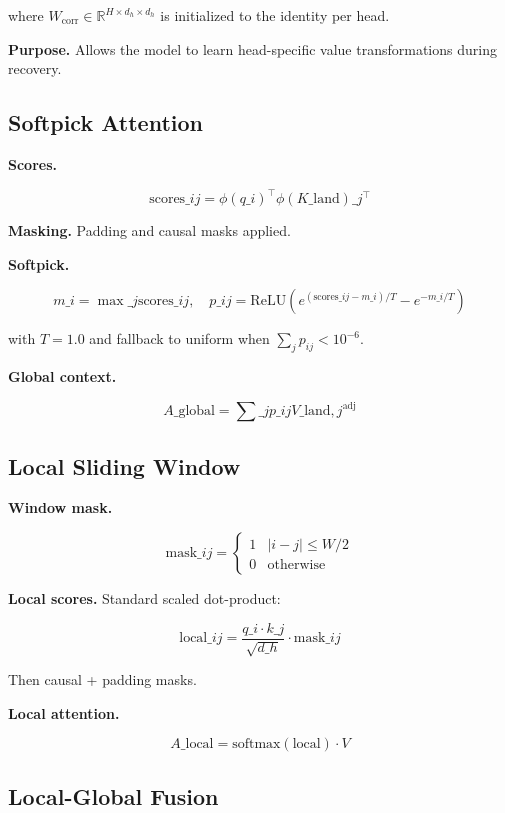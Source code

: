 where $W_\text{corr} \in \mathbb{R}^{H \times d_h \times d_h}$ is 
initialized to the identity per head.

\textbf{Purpose.} Allows the model to learn head-specific value transformations 
during recovery.

\subsection{Softpick Attention}

\textbf{Scores.}

\[
\text{scores}\_{ij} = \phi(q\_i)^\top \phi(K\_\text{land})\_j^\top
\tag{4.7}
\]

\textbf{Masking.} Padding and causal masks applied.

\textbf{Softpick.}

\[
m\_i = \max\_j \text{scores}\_{ij}, \quad
p\_{ij} = \text{ReLU}\!\left(e^{(\text{scores}\_{ij} - m\_i)/T} - e^{-m\_i/T}\right)
\tag{4.8}
\]

with $T = 1.0$ and fallback to uniform when $\sum_j p_{ij} < 10^{-6}$.

\textbf{Global context.}

\[
A\_\text{global} = \sum\_j p\_{ij} V\_{\text{land}, j}^\text{adj}
\tag{4.9}
\]

\subsection{Local Sliding Window}

\textbf{Window mask.}

\[
\text{mask}\_{ij} = \begin{cases} 1 & |i - j| \leq W/2 \\ 0 & \text{otherwise} \end{cases}
\tag{4.10}
\]

\textbf{Local scores.} Standard scaled dot-product:

\[
\text{local}\_{ij} = \frac{q\_i \cdot k\_j}{\sqrt{d\_h}} \cdot \text{mask}\_{ij}
\tag{4.11}
\]

Then causal + padding masks.

\textbf{Local attention.}

\[
A\_\text{local} = \text{softmax}(\text{local}) \cdot V
\tag{4.12}
\]

\subsection{Local-Global Fusion}

